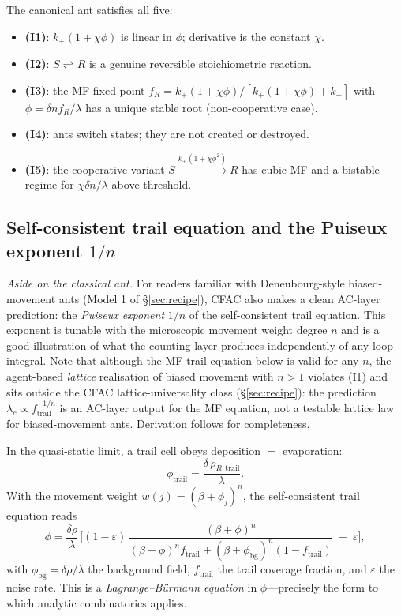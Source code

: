 \documentclass[10pt,a4paper,twocolumn]{article}
\theoremstyle{definition}
\begin{document}
The canonical ant satisfies all five:
\begin{itemize}
  \item \textbf{(I1)}: $k_+(1+\chi\phi)$ is linear in $\phi$;
    derivative is the constant $\chi$.
  \item \textbf{(I2)}: $S\rightleftharpoons R$ is a genuine
    reversible stoichiometric reaction.
  \item \textbf{(I3)}: the MF fixed point
    $f_R = k_+(1{+}\chi\phi)/[k_+(1{+}\chi\phi)+k_-]$ with
    $\phi = \delta n f_R/\lambda$ has a unique stable root
    (non-cooperative case).
  \item \textbf{(I4)}: ants switch states; they are not created
    or destroyed.
  \item \textbf{(I5)}: the cooperative variant
    $S\xrightarrow{k_+(1+\chi\phi^2)}R$ has cubic MF and a
    bistable regime for $\chi\delta n/\lambda$ above threshold.
\end{itemize}

\subsection{Self-consistent trail equation and the Puiseux
  exponent $1/n$}\label{sec:lambda-c}

\emph{Aside on the classical ant.}  For readers familiar with
Deneubourg-style biased-movement ants (Model 1 of
\S\ref{sec:recipe}), CFAC also makes a clean AC-layer prediction:
the \emph{Puiseux exponent} $1/n$ of the self-consistent trail
equation.  This exponent is tunable with the microscopic movement
weight degree $n$ and is a good illustration of what the counting
layer produces independently of any loop integral.  Note that
although the MF trail equation below is valid for any $n$, the
agent-based \emph{lattice} realisation of biased movement with
$n>1$ violates (I1) and sits outside the CFAC
lattice-universality class (\S\ref{sec:recipe}): the prediction
$\lambda_c \propto f_{\text{trail}}^{-1/n}$ is an AC-layer
output for the MF equation, not a testable lattice law for
biased-movement ants.  Derivation follows for completeness.

In the quasi-static limit, a trail cell obeys deposition $=$
evaporation:
\begin{equation}
  \phi_{\text{trail}} = \frac{\delta\,\rho_{R,\text{trail}}}{\lambda}.
\end{equation}
With the movement weight $w(j) = (\beta+\phi_j)^n$, the
self-consistent trail equation reads
\begin{equation}\label{eq:self-consistent}
  \phi = \frac{\delta\rho}{\lambda}\,
  \Biggl[(1{-}\varepsilon)\,
    \frac{(\beta{+}\phi)^n}
         {(\beta{+}\phi)^n f_{\text{trail}} +
          (\beta{+}\phi_{\text{bg}})^n(1{-}f_{\text{trail}})}
    \;+\; \varepsilon
  \Biggr],
\end{equation}
with $\phi_{\text{bg}} = \delta\rho/\lambda$ the background
field, $f_{\text{trail}}$ the trail coverage fraction, and
$\varepsilon$ the noise rate.  This is a
\emph{Lagrange--B\"urmann equation} in $\phi$---precisely the
form to which analytic combinatorics applies.
\end{document}
